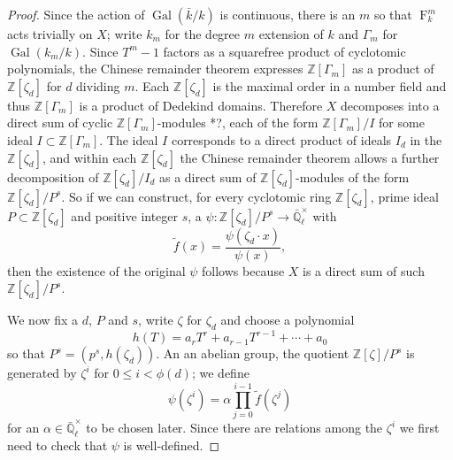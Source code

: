 \documentclass[11pt]{amsart}
\theoremstyle{plain}
\theoremstyle{definition}
\theoremstyle{remark}
\newcommand{\ZZ}{{\mathbb{Z}}}
\newcommand{\EE}{\mathbb{\bar Q}_\ell}
\newcommand{\bFq}{\bar{k}}
\newcommand{\Fq}{k}
\newcommand{\Fqm}{k_m}
\newcommand{\EEx}{\EE^\times}
\DeclareMathOperator{\Gal}{Gal}
\newcommand{\Frob}[1]{\operatorname{F}_{#1}}
\begin{document}
\begin{proof}
  Since the action of $\Gal(\bFq/\Fq)$ is continuous, there is an $m$
  so that $\Frob{\Fq}^m$ acts trivially on $X$; write $\Fqm$ for the degree
  $m$ extension of $\Fq$ and $\Gamma_m$ for $\Gal(\Fqm/\Fq)$.  Since
  $T^m-1$ factors as a squarefree product of cyclotomic polynomials,
  the Chinese remainder theorem expresses $\ZZ[\Gamma_m]$ as a product
  of $\ZZ[\zeta_d]$ for $d$ dividing $m$.  Each $\ZZ[\zeta_d]$ is the
  maximal order in a number field and thus $\ZZ[\Gamma_m]$ is a
  product of Dedekind domains.  Therefore $X$ decomposes into a direct
  sum of cyclic $\ZZ[\Gamma_m]$-modules \cite{Brandal}*{?}, each of the
  form $\ZZ[\Gamma_m] / I$ for some ideal $I \subset \ZZ[\Gamma_m]$.
  The ideal $I$ corresponds to a direct product of ideals $I_d$ in the
  $\ZZ[\zeta_d]$, and within each $\ZZ[\zeta_d]$ the Chinese remainder
  theorem allows a further decomposition of $\ZZ[\zeta_d] / I_d$ as a
  direct sum of $\ZZ[\zeta_d]$-modules of the form $\ZZ[\zeta_d]/P^s$.
  So if we can construct, for every cyclotomic ring $\ZZ[\zeta_d]$,
  prime ideal $P \subset \ZZ[\zeta_d]$ and positive integer $s$, a
  $\psi \colon \ZZ[\zeta_d]/P^s \rightarrow \EEx$ with
  \begin{equation} \label{eq:psi-condition}
    \tilde{f}(x) = \frac{\psi(\zeta_d \cdot x)}{\psi(x)},
  \end{equation}
  then the existence of the original $\psi$ follows because $X$ is a
  direct sum of such $\ZZ[\zeta_d]/P^s$.

  We now fix a $d$, $P$ and $s$, write $\zeta$ for $\zeta_d$ and
  choose a polynomial
  $$h(T) = a_rT^r + a_{r-1}T^{r-1} + \cdots + a_0$$
  so that $P^s = (p^s, h(\zeta_d))$.
  An an abelian group, the quotient $\ZZ[\zeta] / P^s$ is generated by
  $\zeta^i$ for $0 \le i < \phi(d)$; we define
  \begin{equation} \label{eq:psi-def}
    \psi(\zeta^i) = \alpha \prod_{j=0}^{i-1} \tilde{f}(\zeta^j)
  \end{equation}
  for an $\alpha \in \EEx$ to be chosen later.  Since there are
  relations among the $\zeta^i$ we first need to check that $\psi$ is
  well-defined.


\end{proof}
\end{document}
